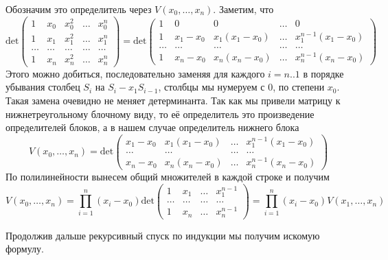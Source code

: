 \documentclass{article}
\begin{document}
\begin{enumerate}
        Обозначим это определитель через $V(x_0,\ldots, x_n)$. Заметим, что
        \[\text{det}\left(\begin{array}{ccccc}
            1 & x_0 & x_0^2 & \ldots & x_0^n\\
            1 & x_1 & x_1^2 & \ldots & x_1^n\\
            \ldots & \ldots & \ldots & \ldots & \ldots\\
            1 & x_n & x_n^2 & \ldots & x_n^n\end{array}
            \right)
            = \text{det}\left(\begin{array}{ccccc}
            1 & 0 & 0 & \ldots & 0\\
                1 & x_1-x_0 & x_1(x_1-x_0) & \ldots & x_1^{n-1}(x_1-x_0)\\
            \ldots & \ldots & \ldots & \ldots & \ldots\\
            1 & x_n-x_0 & x_n(x_n-x_0) & \ldots & x_n^{n-1}(x_n-x_0)\end{array}
            \right)\]
        Этого можно добиться, последовательно заменяя для каждого $i=n..1$ в порядке убывания столбец
        $S_i$ на $S_i-x_1S_{i-1}$, столбцы мы нумеруем с 0, по степени $x_0$. Такая замена очевидно не
        меняет детерминанта. Так как мы привели матрицу к нижнетреугольному блочному виду, то её 
        определитель это произведение определителей блоков, а в нашем случае определитель нижнего блока
        \[
            V(x_0,\ldots,x_n)
            = \text{det}\left(\begin{array}{cccc}
            x_1-x_0 & x_1(x_1-x_0) & \ldots & x_1^{n-1}(x_1-x_0)\\
            \ldots & \ldots & \ldots & \ldots\\
            x_n-x_0 & x_n(x_n-x_0) & \ldots & x_n^{n-1}(x_n-x_0)\end{array}\right)
        \]
        По полилинейности вынесем общий множителей в каждой строке и получим
        \[
            V(x_0,\ldots,x_n) = \prod_{i=1}^n (x_i-x_0)
            \text{det}\left(\begin{array}{cccc}
            1 & x_1 & \ldots & x_1^{n-1}\\
            \ldots & \ldots & \ldots & \ldots\\
            1 & x_n & \ldots & x_n^{n-1}\end{array}\right)
            = \prod_{i=1}^n (x_i-x_0)V(x_1,\ldots,x_n) 
        \]

        Продолжив дальше рекурсивный спуск по индукции мы получим искомую формулу.
        

\end{enumerate}
\end{document}
